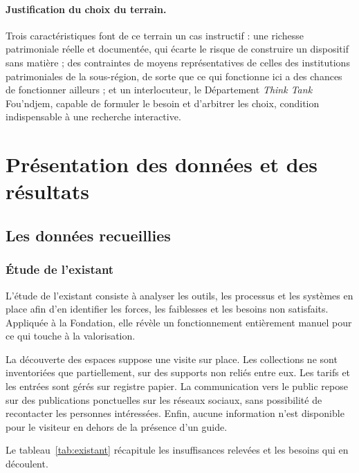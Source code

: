 \paragraph{Justification du choix du terrain.} Trois caractéristiques font de
ce terrain un cas instructif : une richesse patrimoniale réelle et documentée,
qui écarte le risque de construire un dispositif sans matière ; des contraintes
de moyens représentatives de celles des institutions patrimoniales de la
sous-région, de sorte que ce qui fonctionne ici a des chances de fonctionner
ailleurs ; et un interlocuteur, le Département \emph{Think Tank} Fou'ndjem,
capable de formuler le besoin et d'arbitrer les choix, condition indispensable à
une recherche interactive.

\section{Présentation des données et des résultats}
\label{sec:donnees}

\subsection{Les données recueillies}

\subsubsection{Étude de l'existant}

L'étude de l'existant consiste à analyser les outils, les processus et les
systèmes en place afin d'en identifier les forces, les faiblesses et les besoins
non satisfaits. Appliquée à la Fondation, elle révèle un fonctionnement
entièrement manuel pour ce qui touche à la valorisation.

La découverte des espaces suppose une visite sur place. Les collections ne sont
inventoriées que partiellement, sur des supports non reliés entre eux. Les
tarifs et les entrées sont gérés sur registre papier. La communication vers le
public repose sur des publications ponctuelles sur les réseaux sociaux, sans
possibilité de recontacter les personnes intéressées. Enfin, aucune information
n'est disponible pour le visiteur en dehors de la présence d'un guide.

Le tableau~\ref{tab:existant} récapitule les insuffisances relevées et les
besoins qui en découlent.

